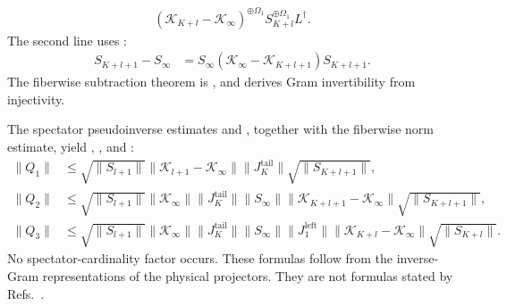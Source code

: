 \documentclass{article}
\begin{document}
\begin{itemize}
\begin{align}
              (\mathcal K_{K+l}-\mathcal K_\infty)^{\oplus\Omega_1}
              S_{K+l}^{\oplus\Omega_1}L^\dagger.
              \label{eq:cpgsv21_martingale_overlap_c3_third_correction}
          \end{align}
          The second line uses
          :
          \begin{align}
              S_{K+l+1}-S_\infty
               & =
              S_\infty
              (\mathcal K_\infty-\mathcal K_{K+l+1})
              S_{K+l+1}.
              \label{eq:cpgsv21_martingale_overlap_inverse_resolvent_identity}
          \end{align}
          The fiberwise subtraction theorem is
          , and
          derives Gram invertibility from injectivity.

          The spectator pseudoinverse estimates
           and
          ,
          together with the fiberwise norm estimate, yield
          ,
          , and
          :
          \begin{align}
              \lVert Q_1\rVert
               & \leq
              \sqrt{\lVert S_{l+1}\rVert}
              \lVert\mathcal K_{l+1}-\mathcal K_\infty\rVert
              \lVert J_K^{\mathrm{tail}}\rVert
              \sqrt{\lVert S_{K+l+1}\rVert},
              \label{eq:cpgsv21_martingale_overlap_c3_first_correction_bound}  \\
              \lVert Q_2\rVert
               & \leq
              \sqrt{\lVert S_{l+1}\rVert}
              \lVert\mathcal K_\infty\rVert
              \lVert J_K^{\mathrm{tail}}\rVert
              \lVert S_\infty\rVert
              \lVert\mathcal K_{K+l+1}-\mathcal K_\infty\rVert
              \sqrt{\lVert S_{K+l+1}\rVert},
              \label{eq:cpgsv21_martingale_overlap_c3_second_correction_bound} \\
              \lVert Q_3\rVert
               & \leq
              \sqrt{\lVert S_{l+1}\rVert}
              \lVert\mathcal K_\infty\rVert
              \lVert J_K^{\mathrm{tail}}\rVert
              \lVert S_\infty\rVert
              \lVert J_1^{\mathrm{left}}\rVert
              \lVert\mathcal K_{K+l}-\mathcal K_\infty\rVert
              \sqrt{\lVert S_{K+l}\rVert}.
              \label{eq:cpgsv21_martingale_overlap_c3_third_correction_bound}
          \end{align}
          No spectator-cardinality factor occurs. These formulas follow from the
          inverse-Gram representations of the physical projectors. They are not
          formulas stated by
          Refs.~\cite{Fannes1992Finitely,Nachtergaele1996Spectral,Cirac2021Matrix}.
\end{itemize}
\end{document}
